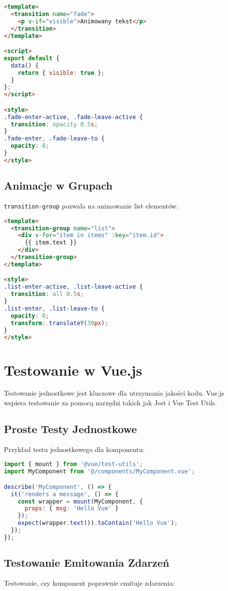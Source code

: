 \documentclass[a4paper,12pt]{article}
\begin{document}
\begin{lstlisting}[language=HTML]
<template>
  <transition name="fade">
    <p v-if="visible">Animowany tekst</p>
  </transition>
</template>

<script>
export default {
  data() {
    return { visible: true };
  }
};
</script>

<style>
.fade-enter-active, .fade-leave-active {
  transition: opacity 0.5s;
}
.fade-enter, .fade-leave-to {
  opacity: 0;
}
</style>
\end{lstlisting}

\subsection{Animacje w Grupach}
\texttt{transition-group} pozwala na animowanie list elementów.

\begin{lstlisting}[language=HTML]
<template>
  <transition-group name="list">
    <div v-for="item in items" :key="item.id">
      {{ item.text }}
    </div>
  </transition-group>
</template>

<style>
.list-enter-active, .list-leave-active {
  transition: all 0.5s;
}
.list-enter, .list-leave-to {
  opacity: 0;
  transform: translateY(30px);
}
</style>
\end{lstlisting}

\section{Testowanie w Vue.js}
Testowanie jednostkowe jest kluczowe dla utrzymania jakości kodu. Vue.js wspiera testowanie za pomocą narzędzi takich jak Jest i Vue Test Utils.

\subsection{Proste Testy Jednostkowe}
Przykład testu jednostkowego dla komponentu:

\begin{lstlisting}[language=JavaScript]
import { mount } from '@vue/test-utils';
import MyComponent from '@/components/MyComponent.vue';

describe('MyComponent', () => {
  it('renders a message', () => {
    const wrapper = mount(MyComponent, {
      props: { msg: 'Hello Vue' }
    });
    expect(wrapper.text()).toContain('Hello Vue');
  });
});
\end{lstlisting}

\subsection{Testowanie Emitowania Zdarzeń}
Testowanie, czy komponent poprawnie emituje zdarzenia:
\end{document}

